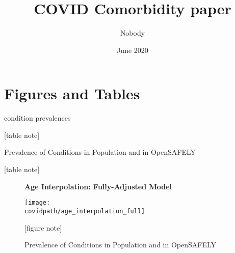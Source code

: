 \documentclass[12pt,letterpaper]{article}
\title{COVID Comorbidity paper} \author{Nobody}
\numberwithin{equation}{section}
\begin{document}
\date{June 2020}

  \section{Figures and Tables}
 
   \begin{table}[H]
    \begin{center}
     \caption{condition prevalences }
     
     
     \footnotesize{[table note]}
    \end{center}
   \end{table}
 
  \begin{table}[H]
    \begin{center}
    \caption{Prevalence of Conditions in Population and in OpenSAFELY}
    
    
    \footnotesize{[table note]}
    \end{center}
  \end{table}

  \clearpage
  \begin{figure}[H]
    \begin{center}
    \caption{Prevalence of Conditions in Population and in OpenSAFELY}
     \textbf{Age Interpolation: Fully-Adjusted Model}
    
    \texttt{[image: \\covidpath/age\_interpolation\_full]}
    
    \footnotesize{[figure note]}
    \end{center}
  \end{figure}
\end{document}
